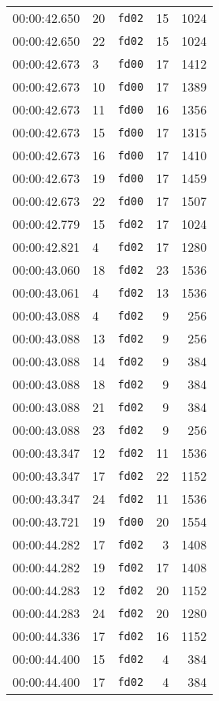 \documentclass{article}
\begin{document}
\begin{longtable}{lllrr}
00:00:42.650 & 20 & \texttt{fd02} & 15 & 1024 \\
00:00:42.650 & 22 & \texttt{fd02} & 15 & 1024 \\
00:00:42.673 & 3 & \texttt{fd00} & 17 & 1412 \\
00:00:42.673 & 10 & \texttt{fd00} & 17 & 1389 \\
00:00:42.673 & 11 & \texttt{fd00} & 16 & 1356 \\
00:00:42.673 & 15 & \texttt{fd00} & 17 & 1315 \\
00:00:42.673 & 16 & \texttt{fd00} & 17 & 1410 \\
00:00:42.673 & 19 & \texttt{fd00} & 17 & 1459 \\
00:00:42.673 & 22 & \texttt{fd00} & 17 & 1507 \\
00:00:42.779 & 15 & \texttt{fd02} & 17 & 1024 \\
00:00:42.821 & 4 & \texttt{fd02} & 17 & 1280 \\
00:00:43.060 & 18 & \texttt{fd02} & 23 & 1536 \\
00:00:43.061 & 4 & \texttt{fd02} & 13 & 1536 \\
00:00:43.088 & 4 & \texttt{fd02} & 9 & 256 \\
00:00:43.088 & 13 & \texttt{fd02} & 9 & 256 \\
00:00:43.088 & 14 & \texttt{fd02} & 9 & 384 \\
00:00:43.088 & 18 & \texttt{fd02} & 9 & 384 \\
00:00:43.088 & 21 & \texttt{fd02} & 9 & 384 \\
00:00:43.088 & 23 & \texttt{fd02} & 9 & 256 \\
00:00:43.347 & 12 & \texttt{fd02} & 11 & 1536 \\
00:00:43.347 & 17 & \texttt{fd02} & 22 & 1152 \\
00:00:43.347 & 24 & \texttt{fd02} & 11 & 1536 \\
00:00:43.721 & 19 & \texttt{fd00} & 20 & 1554 \\
00:00:44.282 & 17 & \texttt{fd02} & 3 & 1408 \\
00:00:44.282 & 19 & \texttt{fd02} & 17 & 1408 \\
00:00:44.283 & 12 & \texttt{fd02} & 20 & 1152 \\
00:00:44.283 & 24 & \texttt{fd02} & 20 & 1280 \\
00:00:44.336 & 17 & \texttt{fd02} & 16 & 1152 \\
00:00:44.400 & 15 & \texttt{fd02} & 4 & 384 \\
00:00:44.400 & 17 & \texttt{fd02} & 4 & 384 \\

\end{longtable}
\end{document}
